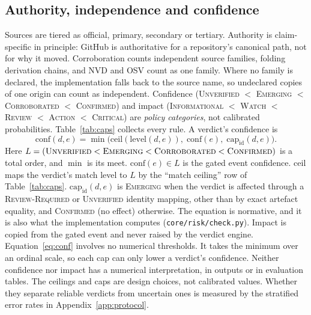 \documentclass[11pt,a4paper]{article}
\newcommand{\code}[1]{\texttt{#1}}
\begin{document}
\subsection{Authority, independence and confidence}
Sources are tiered as official, primary, secondary or tertiary.
Authority is claim-specific in principle: GitHub is authoritative for a
repository's canonical path, not for why it moved. Corroboration counts
independent source families, folding derivation chains, and NVD and OSV
count as one family. Where no family is declared, the implementation
falls back to the source name, so undeclared copies of one origin can
count as independent. Confidence (\textsc{Unverified} $<$
\textsc{Emerging} $<$ \textsc{Corroborated} $<$ \textsc{Confirmed}) and
impact (\textsc{Informational} $<$ \textsc{Watch} $<$ \textsc{Review}
$<$ \textsc{Action} $<$ \textsc{Critical}) are \emph{policy categories},
not calibrated probabilities. Table~\ref{tab:caps} collects every rule.
A verdict's confidence is
\begin{equation}
\label{eq:conf}
\mathrm{conf}(d,e) = \min\bigl(\mathrm{ceil}(\mathrm{level}(d,e)),\;
  \mathrm{conf}(e),\; \mathrm{cap}_{\mathrm{id}}(d,e)\bigr).
\end{equation}
Here $L = (\textsc{Unverified} < \textsc{Emerging} <
\textsc{Corroborated} < \textsc{Confirmed})$ is a total order, and
$\min$ is its meet. $\mathrm{conf}(e) \in L$ is the gated event
confidence. $\mathrm{ceil}$ maps the verdict's match level to $L$ by
the ``match ceiling'' row of Table~\ref{tab:caps}.
$\mathrm{cap}_{\mathrm{id}}(d,e)$ is \textsc{Emerging} when the verdict
is affected through a \textsc{Review-Required} or \textsc{Unverified}
identity mapping, other than by exact artefact equality, and
\textsc{Confirmed} (no effect) otherwise. The equation is normative,
and it is also what the implementation computes
(\code{core/risk/check.py}). Impact is copied from the gated event and
never raised by the verdict engine. Equation~\eqref{eq:conf} involves
no numerical thresholds. It takes the minimum over an ordinal scale,
so each cap can only lower a verdict's confidence. Neither confidence
nor impact has a numerical interpretation, in outputs or in
evaluation tables. The ceilings and caps are design choices, not
calibrated values. Whether they separate reliable verdicts from
uncertain ones is measured by the stratified error rates in
Appendix~\ref{app:protocol}.
\end{document}
